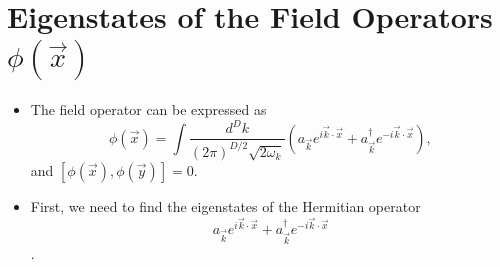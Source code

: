 \documentclass[10pt, a4paper]{article}
\numberwithin{equation}{section}
\begin{document}
	\section{Eigenstates of the Field Operators \texorpdfstring{$\phi(\vec{x})$}{phi(x)}}
	\begin{itemize}
		\item The field operator can be expressed as
		\begin{equation}
			\phi(\vec{x}) = \int \frac{d^D k}{(2 \pi)^{D / 2} \sqrt{2 \omega_k}} (a_{\vec{k}} e^{i \vec{k} \cdot \vec{x}} + a^\dag_{\vec{k}} e^{- i \vec{k} \cdot \vec{x}}),
		\end{equation}
		and $[\phi(\vec{x}), \phi(\vec{y})] = 0$.
		
		\item First, we need to find the eigenstates of the Hermitian operator
		\begin{equation} \label{B.2}
			a_{\vec{k}} e^{i \vec{k} \cdot \vec{x}} + a^\dag_{\vec{k}} e^{- i \vec{k} \cdot \vec{x}}
		\end{equation}
		.
		

\end{itemize}
\end{document}
